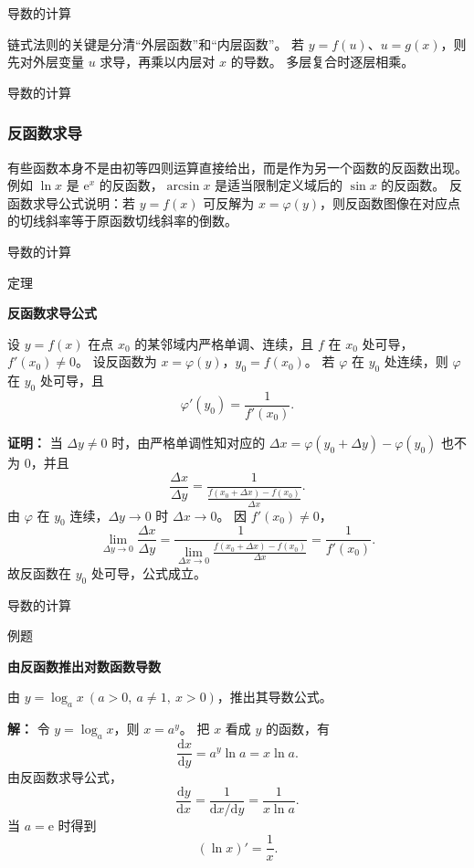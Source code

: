 \documentclass[aspectratio=169,10pt,fontset=fandol]{ctexbeamer}
\newcommand{\dd}{\mathrm{d}}
\newcommand{\ee}{\mathrm{e}}
\begin{document}
\begin{frame}[t,fragile]{导数的计算}
\normalsize
{\normalsize
链式法则的关键是分清“外层函数”和“内层函数”。 若 $y=f(u)$、$u=g(x)$，则先对外层变量 $u$ 求导，再乘以内层对 $x$ 的导数。 多层复合时逐层相乘。

}
\end{frame}
\begin{frame}[t,fragile]{导数的计算}
\normalsize
{\normalsize
\subsubsection*{反函数求导}


}
{\normalsize
有些函数本身不是由初等四则运算直接给出，而是作为另一个函数的反函数出现。 例如 $\ln x$ 是 $\ee^x$ 的反函数，$\arcsin x$ 是适当限制定义域后的 $\sin x$ 的反函数。 反函数求导公式说明：若 $y=f(x)$ 可反解为 $x=\varphi(y)$，则反函数图像在对应点的切线斜率等于原函数切线斜率的倒数。


}
\end{frame}
\begin{frame}[t,fragile]{导数的计算}
\small
\begin{block}{定理}
{\small
\textbf{反函数求导公式}\par

设 $y=f(x)$ 在点 $x_0$ 的某邻域内严格单调、连续，且 $f$ 在 $x_0$ 处可导，$f'(x_0)\neq0$。 设反函数为 $x=\varphi(y)$，$y_0=f(x_0)$。 若 $\varphi$ 在 $y_0$ 处连续，则 $\varphi$ 在 $y_0$ 处可导，且
\[
\varphi'(y_0)=\frac{1}{f'(x_0)}.
\]

}
\end{block}
\pause
{\small
\textbf{证明：}
当 $\Delta y\neq0$ 时，由严格单调性知对应的 $\Delta x=\varphi(y_0+\Delta y)-\varphi(y_0)$ 也不为 $0$，并且
\[
\frac{\Delta x}{\Delta y}
=\frac{1}{\frac{f(x_0+\Delta x)-f(x_0)}{\Delta x}}.
\]
由 $\varphi$ 在 $y_0$ 连续，$\Delta y\to0$ 时 $\Delta x\to0$。 因 $f'(x_0)\neq0$，
\[
\lim_{\Delta y\to0}\frac{\Delta x}{\Delta y}
=\frac{1}{\lim_{\Delta x\to0}\frac{f(x_0+\Delta x)-f(x_0)}{\Delta x}}
=\frac1{f'(x_0)}.
\]
故反函数在 $y_0$ 处可导，公式成立。

}
\end{frame}
\begin{frame}[t,fragile]{导数的计算}
\normalsize
\begin{block}{例题}
{\normalsize
\textbf{由反函数推出对数函数导数}\par

由 $y=\log_a x\ (a>0,\ a\neq1,\ x>0)$，推出其导数公式。

}
\end{block}
\pause
{\normalsize
\textbf{解：}
令 $y=\log_a x$，则 $x=a^y$。 把 $x$ 看成 $y$ 的函数，有
\[
\frac{\dd x}{\dd y}=a^y\ln a=x\ln a.
\]
由反函数求导公式，
\[
\frac{\dd y}{\dd x}
=\frac{1}{\dd x/\dd y}
=\frac{1}{x\ln a}.
\]
当 $a=\ee$ 时得到
\[
(\ln x)'=\frac1x.
\]

}
\end{frame}
\end{document}
